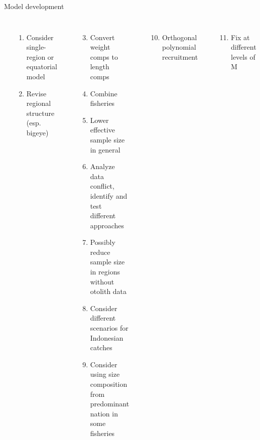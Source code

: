 \documentclass[aspectratio=169]{beamer}
\begin{document}
\begin{frame}{Model development}\fns
  \vspace{-2ex}
  \begin{columns}[T]
    \\[-0.8ex]
    \begin{enumerate}\setlength\itemsep{-0.3ex}
      \item Consider single-region or equatorial model
      \item Revise regional structure (esp. bigeye)\\[1.5ex]
    \end{enumerate}
    \\[-0.8ex]
    \begin{enumerate}\setcounter{enumi}{2}\setlength\itemsep{-0.3ex}
      \item Convert weight comps to length comps
      \item Combine fisheries
      \item Lower effective sample size in general
      \item Analyze data conflict, identify and test different
      approaches
      \item Possibly reduce sample size in regions without otolith data
      \item Consider different scenarios for Indonesian catches
      \item Consider using size composition from predominant nation in some
      fisheries
    \end{enumerate}
    \\[-0.8ex]
    \begin{enumerate}\setcounter{enumi}{9}\setlength\itemsep{-0.3ex}
      \item Orthogonal polynomial recruitment\\[1.2ex]
    \end{enumerate}
    \\[-0.8ex]
    \begin{enumerate}\setcounter{enumi}{10}\setlength\itemsep{-0.3ex}
      \item Fix at different levels of M\\[1.2ex]
    \end{enumerate}
    \\[-0.8ex]
    \begin{enumerate}\setcounter{enumi}{11}\setlength\itemsep{-0.3ex}

\end{enumerate}
\end{columns}
\end{frame}
\end{document}
